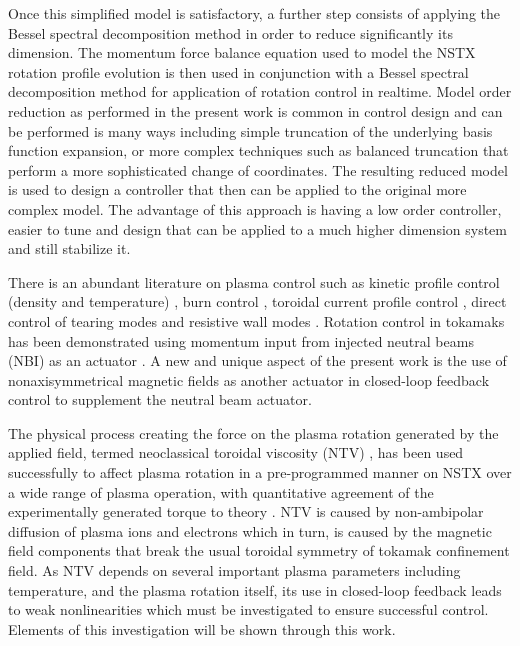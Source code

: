 \documentclass[12pt]{iopart}
\begin{document}
Once this simplified model is satisfactory, a further step consists of applying the Bessel spectral decomposition method in order to reduce significantly its dimension. The momentum force balance equation used to model the NSTX rotation profile evolution is then used in conjunction with a Bessel spectral decomposition method for application of rotation control in realtime. Model order reduction as performed in the present work is common in control design and can be performed is many ways including simple truncation of the underlying basis function expansion, or more complex techniques such as balanced truncation \cite{Moore81} that perform a more sophisticated change of coordinates. The resulting reduced model is used to design a controller that then can be applied to the original more complex model. The advantage of this approach is having a low order controller, easier to tune and design that can be applied to a much higher dimension system and still stabilize it.
 
There is an abundant literature on plasma control such as kinetic profile control (density and temperature) \cite{Schuster02, Boyer11}, burn control \cite{Schuster01, Schuster02-2, Schuster02-3, Vitela98, Boyer12}, toroidal current profile control \cite{Boyer133, Boyer144, Barton12, Ou09, Ebrahimi04}, direct control of tearing modes \cite{Welander13, Volpe09} and resistive wall modes \cite{Sabbagh06,Sabbagh13}. Rotation control in tokamaks has been demonstrated using momentum input from injected neutral beams (NBI) as an actuator \cite{Scoville07}.  A new and unique aspect of the present work is the use of nonaxisymmetrical magnetic fields as another actuator in closed-loop feedback control to supplement the neutral beam actuator. 

The physical process creating the force on the plasma rotation generated by the applied field, termed neoclassical toroidal viscosity (NTV) \cite{Shaing88, Shaing10}, has been used successfully to affect plasma rotation in a pre-programmed manner on NSTX over a wide range of plasma operation, with quantitative agreement of the experimentally generated torque to theory \cite{Zhu06}. NTV is caused by non-ambipolar diffusion of plasma ions and electrons which in turn, is caused by the magnetic field components that break the usual toroidal symmetry of tokamak confinement field. As NTV depends on several important plasma parameters including temperature, and the plasma rotation itself, its use in closed-loop feedback leads to weak nonlinearities which must be investigated to ensure successful control. Elements of this investigation will be shown through this work. 
\end{document}
